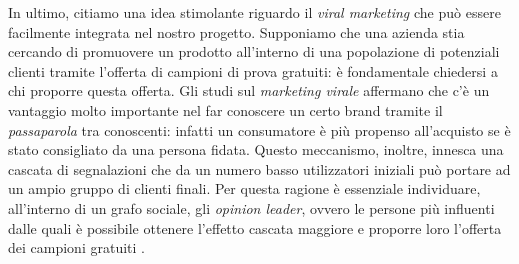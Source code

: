 In ultimo, citiamo una idea stimolante riguardo il \textit{viral marketing} che pu\`o essere facilmente integrata nel nostro progetto. Supponiamo che una azienda stia cercando di promuovere un prodotto all'interno di una popolazione di potenziali clienti tramite l'offerta di campioni di prova gratuiti: \`e fondamentale chiedersi a chi proporre questa offerta. Gli studi sul \textit{marketing virale} \cite{WOM} affermano che c'\`e un vantaggio molto importante nel far conoscere un certo brand tramite il \textit{passaparola} tra conoscenti: infatti un consumatore \`e pi\`u propenso all'acquisto se \`e stato consigliato da una persona fidata. Questo meccanismo, inoltre, innesca una cascata di segnalazioni che da un numero basso utilizzatori iniziali pu\`o portare ad un ampio gruppo di clienti finali. Per questa ragione \`e essenziale individuare, all'interno di un grafo sociale, gli \textit{opinion leader}, ovvero le persone pi\`u influenti dalle quali \`e possibile ottenere l'effetto cascata maggiore e proporre loro l'offerta dei campioni gratuiti \cite{InfluNodes}.